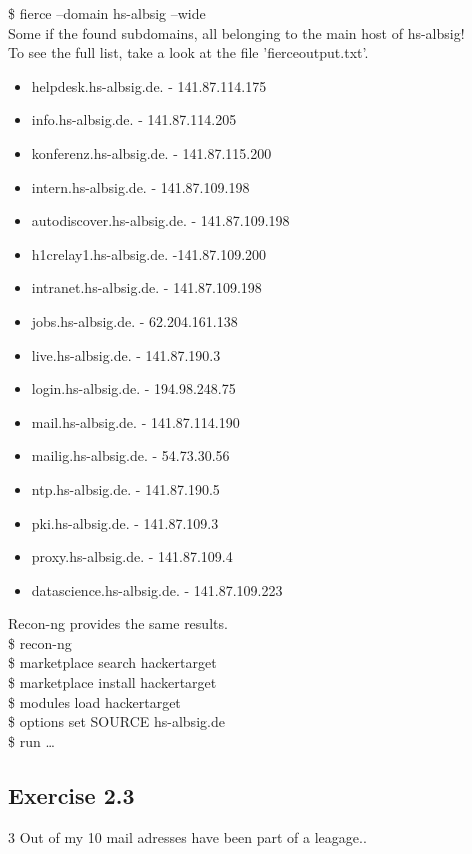 \documentclass[a4paper,10pt]{article}
\begin{document}
\noindent\$\raisebox{-0.9ex}{\~{}} fierce --domain hs-albsig --wide\\
Some if the found subdomains, all belonging to the main host of hs-albsig!\\
To see the full list, take a look at the file 'fierceoutput.txt'.  
\\
\begin{itemize}
 \item helpdesk.hs-albsig.de. - 141.87.114.175
 \item info.hs-albsig.de. - 141.87.114.205
 \item konferenz.hs-albsig.de. - 141.87.115.200
 \item intern.hs-albsig.de. - 141.87.109.198
 \item autodiscover.hs-albsig.de. - 141.87.109.198
 \item h1crelay1.hs-albsig.de. -141.87.109.200
 \item intranet.hs-albsig.de. - 141.87.109.198
 \item jobs.hs-albsig.de. - 62.204.161.138
 \item live.hs-albsig.de. - 141.87.190.3
 \item login.hs-albsig.de. - 194.98.248.75
 \item mail.hs-albsig.de. - 141.87.114.190
 \item mailig.hs-albsig.de. - 54.73.30.56
 \item ntp.hs-albsig.de. - 141.87.190.5
 \item pki.hs-albsig.de. - 141.87.109.3
 \item proxy.hs-albsig.de. - 141.87.109.4
 \item datascience.hs-albsig.de. - 141.87.109.223
  

\end{itemize}

\vspace{10mm}
\noindent Recon-ng provides the same results.\\
\noindent\$\raisebox{-0.9ex}{\~{}} recon-ng\\
\$\raisebox{-0.9ex}{\~{}} marketplace search hackertarget\\
\$\raisebox{-0.9ex}{\~{}} marketplace install hackertarget\\
\$\raisebox{-0.9ex}{\~{}} modules load hackertarget\\ 
\$\raisebox{-0.9ex}{\~{}} options set SOURCE hs-albsig.de\\
\$\raisebox{-0.9ex}{\~{}} run \dots

\newpage
\subsection{Exercise 2.3}
3 Out of my 10 mail adresses have been part of a leagage..
\end{document}
